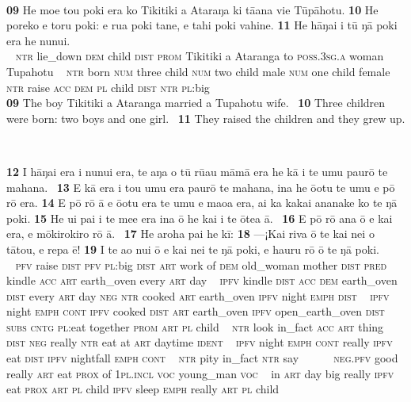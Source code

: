 {~

\bigskip\gll
\textbf{\textup{09}} He moe tou poki era ko Tikitiki {\ꞌ}a {\ꞌ}Ataraŋa ki tā{\ꞌ}ana vi{\ꞌ}e Tūpāhotu. \textbf{\textup{10}} He poreko e toru poki: e rua poki tane, e tahi poki vahine. \textbf{\textup{11}} He hāŋai i tū ŋā poki era he nunui.\\
~ \textsc{ntr} lie\_down \textsc{dem} child \textsc{dist} \textsc{prom} Tikitiki a Ataranga to \textsc{poss.3sg.a} woman Tupahotu ~ \textsc{ntr} born \textsc{num} three child \textsc{num} two child male \textsc{num} one child female  ~ \textsc{ntr} raise \textsc{acc} \textsc{dem} \textsc{pl} child \textsc{dist} \textsc{ntr} \textsc{pl}:big\\

\medskip\glt
\textbf{\textup{09}} The boy Tikitiki a Ataranga married a Tupahotu wife. ~\textbf{\textup{10}} Three children were born: two boys and one girl. ~\textbf{\textup{11}} They raised the children and they grew up.


~

\bigskip\gll
\textbf{\textup{12}} I hāŋai era i nunui era, te aŋa o tū rū{\ꞌ}au māmā era he kā i te {\ꞌ}umu paurō te mahana. ~\textbf{\textup{13}} E kā era i tou {\ꞌ}umu era paurō te mahana, {\ꞌ}ina he {\ꞌ}ō{\ꞌ}otu te {\ꞌ}umu e pō rō era. \textbf{\textup{14}} E pō rō {\ꞌ}ā e {\ꞌ}ō{\ꞌ}otu era te {\ꞌ}umu e ma{\ꞌ}oa era, {\ꞌ}ai ka kakai ananake ko te ŋā poki. \textbf{\textup{15}} He u{\ꞌ}i pa{\ꞌ}i i te me{\ꞌ}e era {\ꞌ}ina {\ꞌ}ō he kai {\ꞌ}i te {\ꞌ}ōtea {\ꞌ}ā. ~\textbf{\textup{16}} E pō rō {\ꞌ}ana {\ꞌ}ō e kai era, e mōkirokiro rō {\ꞌ}ā. ~\textbf{\textup{17}} He {\ꞌ}aroha pa{\ꞌ}i he kī: \textbf{\textup{18}} —¡Kai riva {\ꞌ}ō te kai nei o tātou, e repa ē! \textbf{\textup{19}} {\ꞌ}I te {\ꞌ}ao nui {\ꞌ}ō e kai nei te ŋā poki, e ha{\ꞌ}uru rō {\ꞌ}ō te ŋā poki.\\
~ \textsc{pfv} raise \textsc{dist} \textsc{pfv} \textsc{pl}:big \textsc{dist} \textsc{art} work of \textsc{dem} old\_woman mother \textsc{dist} \textsc{pred} kindle \textsc{acc} \textsc{art} earth\_oven every \textsc{art} day ~ \textsc{ipfv} kindle \textsc{dist} \textsc{acc} \textsc{dem} earth\_oven \textsc{dist} every \textsc{art} day \textsc{neg} \textsc{ntr} cooked \textsc{art} earth\_oven \textsc{ipfv} night \textsc{emph} \textsc{dist}  ~ \textsc{ipfv} night \textsc{emph} \textsc{cont} \textsc{ipfv} cooked \textsc{dist} \textsc{art} earth\_oven \textsc{ipfv} open\_earth\_oven \textsc{dist} \textsc{subs} \textsc{cntg} \textsc{pl}:eat together \textsc{prom} \textsc{art} \textsc{pl} child ~ \textsc{ntr} look in\_fact \textsc{acc} \textsc{art} thing \textsc{dist} \textsc{neg} really \textsc{ntr} eat at \textsc{art} daytime \textsc{ident} ~ \textsc{ipfv} night \textsc{emph} \textsc{cont} really \textsc{ipfv} eat \textsc{dist} \textsc{ipfv} nightfall \textsc{emph} \textsc{cont} ~ \textsc{ntr} pity in\_fact \textsc{ntr} say ~ ~~~~\textsc{neg.pfv} good really \textsc{art} eat \textsc{prox} of \textsc{1pl.incl} \textsc{voc} young\_man \textsc{voc}  ~ in \textsc{art} day big really \textsc{ipfv} eat \textsc{prox} \textsc{art} \textsc{pl} child \textsc{ipfv} sleep \textsc{emph} really \textsc{art} \textsc{pl} child\\

}
